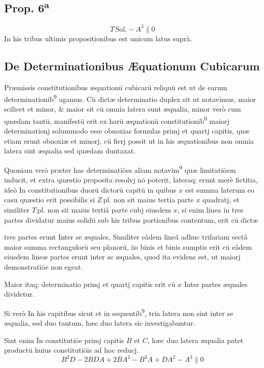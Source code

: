 \documentclass[11pt,a4paper]{article}
\begin{document}
\subsection*{Prop. 6\textsuperscript{a}}
\[ T\,\mathrm{Sol.} - A^{3} \parallel 0 \]
In his tribus ultimis propositionibus est unicum latus suprà.

\subsection*{De Determinationibus Æquationum Cubicarum}

Præmissis constitutionibus æquationū cubicarū reliquū est ut de earum determinationib\textsuperscript{9} agamus. Cū dictæ determinatio duplex sit ut notavimus, maior scilicet et minor, \& maior sit cū omnia latera sunt æqualia, minor verò cum quædam tantū, manifestū erit ex harū æquationū constitutionib\textsuperscript{9} maiorj determinationj solummodo esse obnoxias formulas primj et quartj capitis, quæ etiam erunt obnoxiæ et minorj, cū fierj possit ut in his æquationibus non omnia latera sint æqualia sed quædam duntaxat.

Quoniam verò præter has determinatiōes aliam notavim\textsuperscript{9} quæ limitatiōem inducit, et extra quæstio proposita resolvj nō poterit, lateraq; erunt merè fictitia, ideò In constitutionibus duorū dictorū capitū in quibus $x$ est summa laterum eo casu quæstio erit possibilis si $Z\,\mathrm{pl.}$ non sit maius tertia parte $x$ quadratj, et similiter $T\,\mathrm{pl.}$ non sit maius tertiâ parte cubj eiusdem $x$, si enim linea in tres partes dividatur maius solidū sub his tribus portionibus contentum, erit cū dictæ


tres partes erunt Inter se æquales, Similiter eâdem lineâ adhuc trifariam sectâ maior summa rectangulorū seu planorū, iis binis et binis sumptis erit cū eâdem eiusdem lineæ partes erunt inter se æquales, quod ita evidens est, ut maiorj demonstratiōe non egeat.

Maior itaq; determinatio primj et quartj capitis erit cū $x$ Inter partes æquales dividetur.

Si verò In his capitibus sicut et in sequentib\textsuperscript{9}, tria latera non sint inter se æqualia, sed duo tantum, hæc duo latera sic investigabuntur.

Sint enim In constitutiōe primj capitis $B$ et $C$, hæc duo latera æqualia patet productū huius constitutiōis ad hoc reducj.
\[ B^{2}D - 2BDA + 2BA^{2} - B^{2}A + DA^{2} - A^{3} \parallel 0 \]
\end{document}
